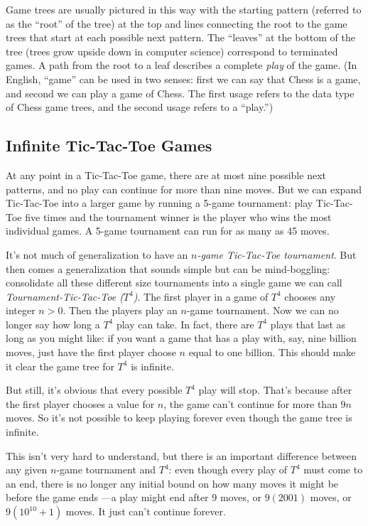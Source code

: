 \begin{definition}
Game trees are usually pictured in this way with the starting pattern
(referred to as the ``root'' of the tree) at the top and lines connecting
the root to the \iffalse roots of the \fi game trees that start at each
possible next pattern.  The ``leaves'' at the bottom of the tree (trees
grow upside down in computer science) correspond to terminated games.  A
path from the root to a leaf describes a complete \emph{play} of the game.
(In English, ``game'' can be used in two senses: first we can say that
Chess is a game, and second we can play a game of Chess.  The first usage
refers to the data type of Chess game trees, and the second usage refers to
a ``play.'')

\subsection{Infinite Tic-Tac-Toe Games}

At any point in a Tic-Tac-Toe game, there are at most nine possible
next patterns, and no play can continue for more than nine moves.  But
we can expand Tic-Tac-Toe into a larger game by running a 5-game
tournament: play Tic-Tac-Toe five times and the tournament winner is
the player who wins the most individual games.  A 5-game tournament
can run for as many as 45 moves.

It's not much of generalization to have an \emph{$n$-game Tic-Tac-Toe
  tournament}.  But then comes a generalization that sounds simple but can
be mind-boggling: consolidate all these different size tournaments into a
single game we can call \emph{Tournament-Tic-Tac-Toe ($T^4$)}.  The first
player in a game of $T^4$ chooses any integer $n > 0$.  Then the players
play an $n$-game tournament.  Now we can no longer say how long a $T^4$
play can take.  In fact, there are $T^4$ plays that last as long as you
might like: if you want a game that has a play with, say, nine billion
moves, just have the first player choose $n$ equal to one billion.  This
should make it clear the game tree for $T^4$ is infinite.

But still, it's obvious that every possible $T^4$ play will stop.
That's because after the first player chooses a value for $n$, the
game can't continue for more than $9n$ moves.  So it's not possible to
keep playing forever even though the game tree is infinite.

This isn't very hard to understand, but there is an important
difference between any given $n$-game tournament and $T^4$: even
though every play of $T^4$ must come to an end, there is no longer any
initial bound on how many moves it might be before the game ends ---a
play might end after 9 moves, or $9(2001)$ moves, or $9(10^{10}+1)$
moves.  It just can't continue forever.


\end{definition}
